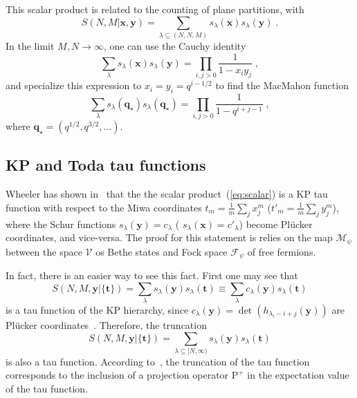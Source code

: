 \documentclass[a4paper,11pt]{amsart}
\begin{document}
This scalar product is related to the counting of plane
partitions, with
\begin{equation}
 S(N, M| \bm{x}, \bm{y}) 
 = \sum_{\lambda \subseteq (N, N, M)} s_{\lambda}(\bm{x}) s_{\lambda} (\bm{y})\; .
\end{equation}
In the limit \(M, N \to \infty\), one can use the Cauchy identity
\begin{equation}
  \sum_{\lambda } s_{\lambda}(\bm{x}) s_{\lambda}(\bm{y})
  = \prod_{i,j>0} \frac{1}{1- x_iy_j}\; ,
\end{equation}
and specialize this expression to \( x_i = y_i = q^{i-1/2} \) to find
the MacMahon function
\begin{equation}
  \sum_{\lambda } s_{\lambda}(\bm{q}_\star) s_{\lambda}(\bm{q}_\star) = \prod_{i,j>0} \frac{1}{1- q^{i +j -1}}\; ,
\end{equation}
where \(\bm{q}_{\star} = (q^{1/2}, q^{3/2}, \dots)\). 


\subsection{KP and Toda tau functions}

Wheeler has shown in~\cite{Wheeler:2010vmq} that the the scalar
product~(\ref{eq:scalar}) is a KP tau function with respect to the
Miwa coordinates \(t_m = \frac{1}{m}\sum_j x_j^m\) (\(t'_m =
\frac{1}{m}\sum_j y_j^m\)), where the Schur functions
\(s_{\lambda}(\bm{y}) = c_\lambda\) ( \(s_{\lambda}(\bm{x}) =
c'_\lambda\)) become Plücker coordinates, and vice-versa.
The proof for this statement is relies on the map \(\mathcal{M}_\psi\)
between the space \(\mathcal{V}\) os Bethe states and Fock
space \(\mathcal{F}_\psi\) of free fermions. 

In fact, there is an easier way to see this fact. First one may see that 
\begin{equation}
 S(N,M,\bm{y}|\{\bm{t}\}) 
 = \sum_{\lambda} s_\lambda(\bm{y})  s_\lambda(\bm{t}) 
 \equiv \sum_{\lambda} c_\lambda(\bm{y})  s_\lambda(\bm{t}) 
\end{equation}
is a tau function of the KP hierarchy, since
\(c_\lambda(\bm{y}) = \det (h_{\lambda_i-i +j}(\bm{y}))\) are Plücker
coordinates~\cite{Miwa2000, Foda:2009zz}. Therefore, the truncation
\begin{equation}
 S(N,M,\bm{y}|\{\bm{t}\}) 
 = \sum_{\lambda \subseteq [N, \infty)} s_\lambda(\bm{y})  s_\lambda(\bm{t}) 
\end{equation}
is also a tau function. According to~\cite{Alexandrov:2012tr,
  Kharchev:1991gd, Zabrodin:2010ii}, the truncation of the tau
function corresponds to the inclusion of a projection operator
\(\mathrm{P}^+\) in the expectation value of the tau function.
\end{document}
